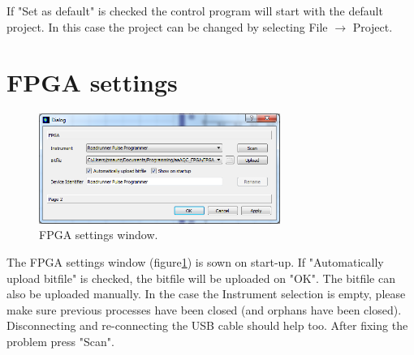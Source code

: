 \documentclass[11pt]{scrartcl}
\begin{document}
If "Set as default" is checked the control program will start with the default project. In this case the project can be changed by selecting File $\rightarrow$ Project.

\section{FPGA settings}
\begin{figure}[htbp]
\begin{center}
\includegraphics[width=0.7\textwidth]{FPGASettings}
\end{center}
\caption{\label{FPGASettings} FPGA settings window.}
\end{figure}
The FPGA settings window (figure\ref{FPGASettings}) is sown on start-up. If "Automatically upload bitfile" is checked, the bitfile will be uploaded on "OK". The bitfile can also be uploaded manually. In the case the Instrument selection is empty, please make sure previous processes have been closed (and orphans have been closed). Disconnecting and re-connecting the USB cable should help too. After fixing the problem press "Scan".
\end{document}
